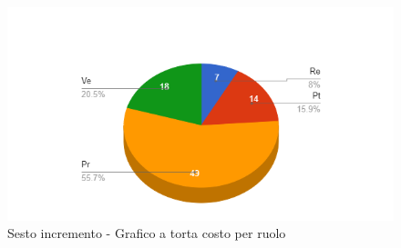 {{\begin{longtable}{C{.4\freewidth} C{.2\freewidth} C{.2\freewidth} C{.2\freewidth} C{.2\freewidth} C{.2\freewidth} C{.2\freewidth} C{.2\freewidth} C{.2\freewidth}}
        \end{longtable}
        \begin{figure}[H]
          \includegraphics[width=15cm]{sezioni/images/sestoT.png}
          \centering
          \caption{Sesto incremento - Grafico a torta costo per ruolo}
       \end{figure}
    }
    }

